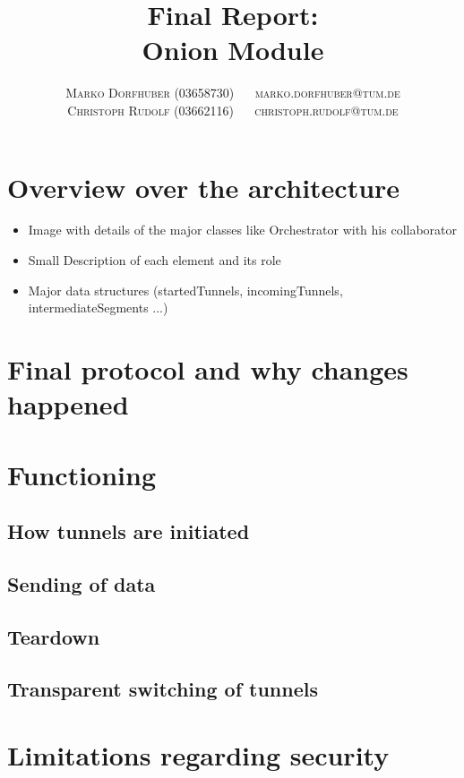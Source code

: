 \documentclass[paper=letter, fontsize=12pt]{article}
\title{\vspace{-15mm}\fontsize{24pt}{10pt}\selectfont\textbf{Final Report: \\Onion Module}} %
\author{
\large
{\textsc{Marko Dorfhuber (03658730) $\quad$ \Letter marko.dorfhuber@tum.de}}\\[2mm]
{\textsc{Christoph Rudolf (03662116) $\quad$ \Letter christoph.rudolf@tum.de}}\\[2mm]
}
\date{}
\begin{document}
\maketitle %
\thispagestyle{fancy} %

\section{Overview over the architecture}
\begin{itemize}
    \item Image with details of the major classes like Orchestrator with his collaborator
    \item Small Description of each element and its role
    \item Major data structures (startedTunnels, incomingTunnels, intermediateSegments ...)
\end{itemize}

\section{Final protocol and why changes happened}

\section{Functioning}

\subsection{How tunnels are initiated}

\subsection{Sending of data}

\subsection{Teardown}

\subsection{Transparent switching of tunnels}

\section{Limitations regarding security}
\end{document}

